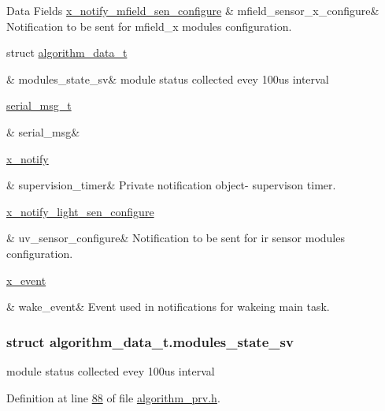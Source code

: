 \begin{DoxyFields}{Data Fields}
\hypertarget{a00016_a1bfdf4869db9c4f125b763d2e27c6c08}{\hyperlink{a00019_d2/d5e/a00860}{x\+\_\+notify\+\_\+mfield\+\_\+sen\+\_\+configure}}\label{a00016_a1bfdf4869db9c4f125b763d2e27c6c08}
&
mfield\+\_\+sensor\+\_\+x\+\_\+configure&
Notification to be sent for mfield\+\_\+x modules configuration. \\
\hline

\hypertarget{a00016_a293140e240bbd54f7601adbc9194148c}{struct \hyperlink{a00016_df/d98/a00107}{algorithm\+\_\+data\+\_\+t}}\label{a00016_a293140e240bbd54f7601adbc9194148c}
&
modules\+\_\+state\+\_\+sv&
module status collected evey 100us interval \\
\hline

\hypertarget{a00016_afcf5f557aea688aad985eec15269c1da}{\hyperlink{a00031_d3/d4f/a00761}{serial\+\_\+msg\+\_\+t}}\label{a00016_afcf5f557aea688aad985eec15269c1da}
&
serial\+\_\+msg&
\\
\hline

\hypertarget{a00016_af13eb2dcaed3eca6506489f8ad8fa768}{\hyperlink{a00036_df/d4c/a00851}{x\+\_\+notify}}\label{a00016_af13eb2dcaed3eca6506489f8ad8fa768}
&
supervision\+\_\+timer&
Private notification object-\/ supervison timer. \\
\hline

\hypertarget{a00016_af1ff980a38b896c99e86279a3c67f00d}{\hyperlink{a00018_da/de3/a00856}{x\+\_\+notify\+\_\+light\+\_\+sen\+\_\+configure}}\label{a00016_af1ff980a38b896c99e86279a3c67f00d}
&
uv\+\_\+sensor\+\_\+configure&
Notification to be sent for ir sensor modules configuration. \\
\hline

\hypertarget{a00016_ad6a897cbacf5ae6902272ee198d5cd23}{\hyperlink{a00036_de/d37/a00849}{x\+\_\+event}}\label{a00016_ad6a897cbacf5ae6902272ee198d5cd23}
&
wake\+\_\+event&
Event used in notifications for wakeing main task. \\
\hline

\end{DoxyFields}
\label{df/d98/a00107}
\hypertarget{a00016_df/d98/a00107}{}
\subsubsection{struct algorithm\+\_\+data\+\_\+t.\+modules\+\_\+state\+\_\+sv}
module status collected evey 100us interval 

Definition at line \hyperlink{a00016_source_l00088}{88} of file \hyperlink{a00016_source}{algorithm\+\_\+prv.\+h}.



